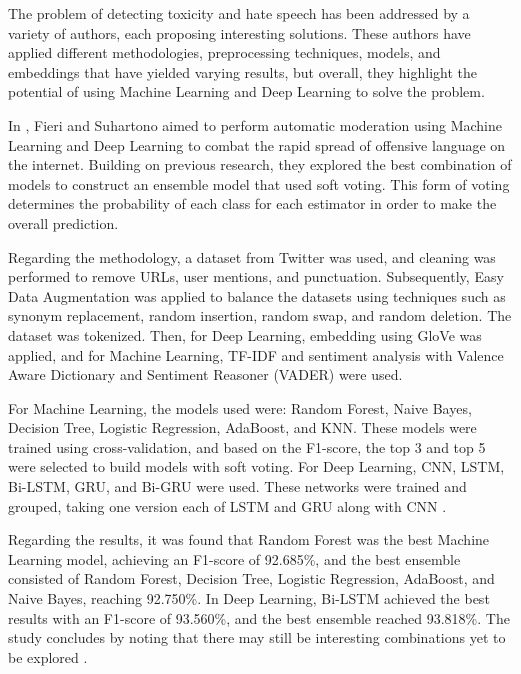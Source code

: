 
The problem of detecting toxicity and hate speech has been addressed by a variety of authors, each proposing interesting solutions. These authors have applied different methodologies, preprocessing techniques, models, and embeddings that have yielded varying results, but overall, they highlight the potential of using Machine Learning and Deep Learning to solve the problem.

In \cite{fieri2023offensive}, Fieri and Suhartono aimed to perform automatic moderation using Machine Learning and Deep Learning to combat the rapid spread of offensive language on the internet. Building on previous research, they explored the best combination of models to construct an ensemble model that used soft voting. This form of voting determines the probability of each class for each estimator in order to make the overall prediction.

Regarding the methodology, a dataset from Twitter was used, and cleaning was performed to remove URLs, user mentions, and punctuation. Subsequently, Easy Data Augmentation was applied to balance the datasets using techniques such as synonym replacement, random insertion, random swap, and random deletion. The dataset was tokenized. Then, for Deep Learning, embedding using GloVe was applied, and for Machine Learning, TF-IDF and sentiment analysis with Valence Aware Dictionary and Sentiment Reasoner (VADER) were used.

For Machine Learning, the models used were: Random Forest, Naive Bayes, Decision Tree, Logistic Regression, AdaBoost, and KNN. These models were trained using cross-validation, and based on the F1-score, the top 3 and top 5 were selected to build models with soft voting. For Deep Learning, CNN, LSTM, Bi-LSTM, GRU, and Bi-GRU were used. These networks were trained and grouped, taking one version each of LSTM and GRU along with CNN \cite{fieri2023offensive}.

Regarding the results, it was found that Random Forest was the best Machine Learning model, achieving an F1-score of 92.685\%, and the best ensemble consisted of Random Forest, Decision Tree, Logistic Regression, AdaBoost, and Naive Bayes, reaching 92.750\%. In Deep Learning, Bi-LSTM achieved the best results with an F1-score of 93.560\%, and the best ensemble reached 93.818\%. The study concludes by noting that there may still be interesting combinations yet to be explored \cite{fieri2023offensive}.

